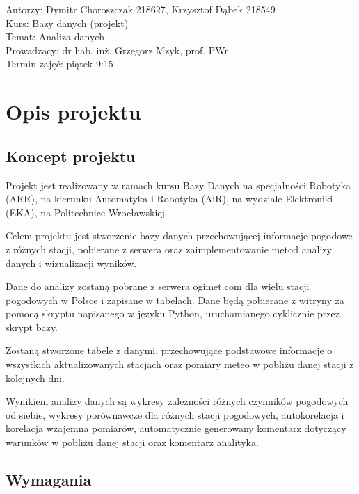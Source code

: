 \documentclass[12pt,a4paper]{article}
\begin{document}
\vspace{20pt}
 
\begin{flushleft}
Autorzy: Dymitr Choroszczak 218627, Krzysztof Dąbek 218549\\
Kurs: Bazy danych (projekt)\\
Temat: Analiza danych\\
Prowadzący: dr hab. inż. Grzegorz Mzyk, prof. PWr\\
Termin zajęć: piątek 9:15\\
\end{flushleft} 
 
\newpage
 
\tableofcontents
 
\newpage
 
\section{Opis projektu}
 
\subsection{Koncept projektu}
\normalsize
Projekt jest realizowany w ramach kursu Bazy Danych na specjalności Robotyka (ARR), na kierunku Automatyka i Robotyka (AiR), na wydziale Elektroniki (EKA), na Politechnice Wrocławskiej.\par
Celem projektu jest stworzenie bazy danych przechowującej informacje pogodowe z różnych stacji, pobierane z serwera oraz zaimplementowanie metod analizy danych i wizualizacji wyników.\par
Dane do analizy zostaną pobrane z serwera ogimet.com dla wielu stacji pogodowych w Polsce i zapisane w tabelach. Dane będą pobierane z witryny za pomocą skryptu napisanego w języku Python, uruchamianego cyklicznie przez skrypt bazy.\par
Zostaną stworzone tabele z danymi, przechowujące podstawowe informacje o wszystkich aktualizowanych stacjach oraz pomiary meteo w pobliżu danej stacji z kolejnych dni.\par
Wynikiem analizy danych są wykresy zależności różnych czynników pogodowych od siebie, wykresy porównawcze dla różnych stacji pogodowych, autokorelacja i korelacja wzajemna pomiarów, automatycznie generowany komentarz dotyczący warunków w pobliżu danej stacji oraz komentarz analityka.
\newpage
\subsection{Wymagania}
\end{document}
